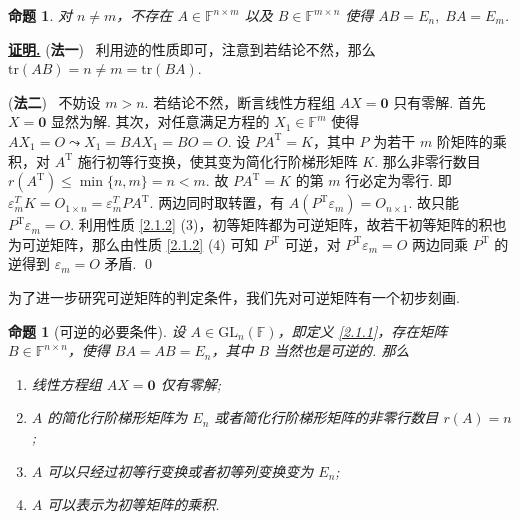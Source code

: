 \documentclass[10pt,openany]{article}
\theoremstyle{thmstyle} %
\theoremstyle{defstyle} %
\theoremstyle{prostyle} %
\newtheorem{proposition}[theorem]{命题}
\theoremstyle{exastyle}
\theoremstyle{remstyle}
\renewenvironment{proof}[1][证明]{\par\underline{\textbf{#1.}} \;\fangsong}{\qed\par}
\newcommand{\T}{^{\text{T}}}
\newcommand{\F}{\mathbb{F}}
\newcommand{\gfn}{\text{GL}_n(\mathbb{F})}
\newcommand{\n}{^{n \times n}}
\newcommand{\mn}{^{m \times n}}
\newcommand{\nm}{^{n \times m}}
\newcommand{\tr}{\mathrm{tr}}
\begin{document}
\begin{proposition}\label{2.1.11}
	对 \( n \neq m \)，不存在 \( A \in \F\nm \) 以及 \( B \in \F\mn \) 使得 \( AB= E_n, \; BA=E_m \).
	
\end{proposition}

\begin{proof}
	(\textbf{法一}) \ 利用迹的性质即可，注意到若结论不然，那么 \(\tr(AB)=n \neq m=\tr(BA) \).
	
	\vspace{1ex}
	
	(\textbf{法二}) \ 不妨设 \( m>n \). 若结论不然，断言线性方程组 \( AX=\bm{0} \) 只有零解. 首先 \( X=\bm{0} \) 显然为解. 其次，对任意满足方程的 \( X_1 \in \F^m \) 使得 \( AX_1=O \leadsto X_1=BAX_1=BO=O \). 设 \( PA\T=K \)，其中 \( P \) 为若干 \( m \) 阶矩阵的乘积，对 \( A\T \) 施行初等行变换，使其变为简化行阶梯形矩阵 \( K \). 那么非零行数目 \( r(A\T) \leq \min\{n,m\}=n<m \). 故 \( PA\T=K \) 的第 \( m \) 行必定为零行. 即 \( \varepsilon_m^T K= O_{1 \times n}= \varepsilon_m^T PA\T \). 两边同时取转置，有 \( A(P\T\varepsilon_m)=O_{n \times 1} \). 故只能 \( P\T\varepsilon_m=O \). 利用性质 \ref{2.1.2} (3)，初等矩阵都为可逆矩阵，故若干初等矩阵的积也为可逆矩阵，那么由性质 \ref{2.1.2} (4) 可知 \( P\T \) 可逆，对  \( P\T\varepsilon_m=O \) 两边同乘 \( P\T \) 的逆得到 \( \varepsilon_m=O \) 矛盾.
\end{proof}

为了进一步研究可逆矩阵的判定条件，我们先对可逆矩阵有一个初步刻画.

\begin{proposition}[可逆的必要条件]\label{2.1.12}
	设 \( A \in \gfn \)，即定义 \ref{2.1.1}，存在矩阵 \( B \in \F\n \)，使得 \( BA=AB=E_n \)，其中 \( B \) 当然也是可逆的. 那么
	\begin{enumerate}[(1)]
		\item 线性方程组 \( AX=\bm{0} \) 仅有零解;
		\item \( A \) 的简化行阶梯形矩阵为 \( E_n \) 或者简化行阶梯形矩阵的非零行数目 \( r(A)=n \);
		\item \( A \) 可以只经过初等行变换或者初等列变换变为 \( E_n \);
		\item \( A \) 可以表示为初等矩阵的乘积.
	\end{enumerate}
	
\end{proposition}
\end{document}
